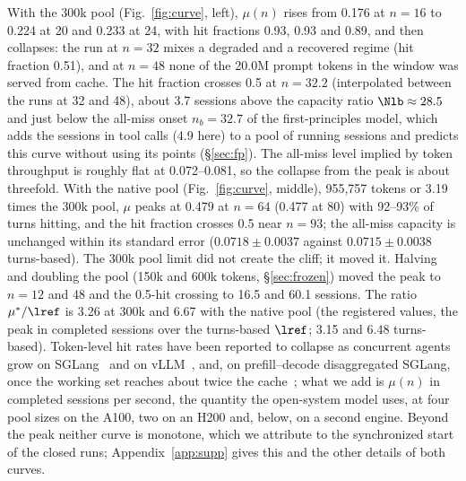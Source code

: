With the 300k pool (Fig.~\ref{fig:curve}, left), $\mu(n)$ rises from 0.176\sps{} at $n=16$ to 0.224 at 20 and 0.233 at 24, with hit fractions 0.93, 0.93 and 0.89, and then collapses: the run at $n=32$ mixes a degraded and a recovered regime (hit fraction 0.51), and at $n=48$ none of the 20.0M prompt tokens in the window was served from cache. The hit fraction crosses 0.5 at $n=32.2$ (interpolated between the runs at 32 and 48), about 3.7 sessions above the capacity ratio $\Nlb\approx28.5$ and just below the all-miss onset $n_b=32.7$ of the first-principles model, which adds the sessions in tool calls (4.9 here) to a pool of running sessions and predicts this curve without using its points (\S\ref{sec:fp}). The all-miss level implied by token throughput is roughly flat at 0.072--0.081\sps, so the collapse from the peak is about threefold. With the native pool (Fig.~\ref{fig:curve}, middle), 955,757 tokens or 3.19 times the 300k pool, $\mu$ peaks at 0.479\sps{} at $n=64$ (0.477 at 80) with 92--93\% of turns hitting, and the hit fraction crosses 0.5 near $n=93$; the all-miss capacity is unchanged within its standard error ($0.0718\pm0.0037$ against $0.0715\pm0.0038$\sps{} turns-based). The 300k pool limit did not create the cliff; it moved it. Halving and doubling the pool (150k and 600k tokens, \S\ref{sec:frozen}) moved the peak to $n=12$ and 48 and the 0.5-hit crossing to 16.5 and 60.1 sessions. The ratio $\mu^*/\lref$ is 3.26 at 300k and 6.67 with the native pool (the registered values, the peak in completed sessions over the turns-based $\lref$; 3.15 and 6.48 turns-based). Token-level hit rates have been reported to collapse as concurrent agents grow on SGLang~\citep{chen2026concur} and on vLLM~\citep{yuan2026agentic,hong2026misat}, and, on prefill--decode disaggregated SGLang, once the working set reaches about twice the cache~\citep{lu2026cachetrap}; what we add is $\mu(n)$ in completed sessions per second, the quantity the open-system model uses, at four pool sizes on the A100, two on an H200 and, below, on a second engine. Beyond the peak neither curve is monotone, which we attribute to the synchronized start of the closed runs; Appendix~\ref{app:supp} gives this and the other details of both curves.

